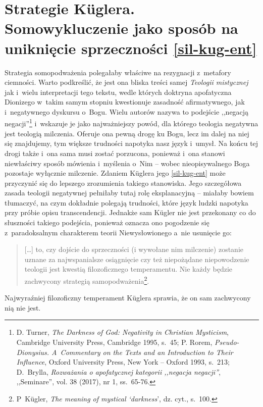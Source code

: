 \section{Strategie Küglera. Somowykluczenie jako sposób na uniknięcie sprzeczności \ref{sil-kug-ent}}

Strategia somopodważenia polegałaby właściwe na rezygnacji z~metafory ciemności. Warto podkreślić, że jest ona bliska treści samej \textit{Teologii mistycznej} jak i~wielu interpretacji tego tekstu, wedle których doktryna apofatyczna Dionizego w~takim samym stopniu kwestionuje zasadność afirmatywnego, jak i~negatywnego dyskursu o~Bogu. Wielu autorów nazywa to podejście ,,negacją negacji''\footnote{D. Turner, \textit{The Darkness of God: Negativity in Christian Mysticism}, Cambridge University Press, Cambridge 1995, s.~45; P. Rorem, \textit{Pseudo-Dionysius. A~Commentary on the Texts and an Introduction to Their Influence}, Oxford University Press, New York -- Oxford 1993, s.~213; D.~Brylla, \textit{Rozważania o apofatycznej kategorii ,,negacja negacji''}, ,,Seminare'', vol. 38 (2017), nr 1, ss.~65-76.} i~wskazuje je jako najważniejszy powód, dla którego teologia negatywna jest teologią milczenia. Oferuje ona pewną drogę ku Bogu, lecz im dalej na niej się znajdujemy, tym większe trudności napotyka nasz język i~umysł. Na końcu tej drogi także i~ona sama musi zostać porzucona, ponieważ i~ona stanowi niewłaściwy sposób mówienia i~myślenia o~Nim -- wobec nieopisywalnego Boga pozostaje wyłącznie milczenie. Zdaniem Küglera jego \ref{sil-kug-ent} może przyczynić się do lepszego zrozumienia takiego stanowiska. Jego szczegółowa zasada teologii negatywnej pełniłaby tutaj rolę eksplanacyjną -- miałaby bowiem tłumaczyć, na czym dokładnie polegają trudności, które język ludzki napotyka przy próbie opisu transcendencji. Jednakże sam Kügler nie jest przekonany co do słuszności takiego podejścia, ponieważ oznacza ono pogodzenie się z~paradoksalnym charakterem teorii Niewysłowionego a~nie usunięcie go:

\begin{quote}
[\ldots] to, czy dojście do sprzeczności (i wywołane nim milczenie) zostanie uznane za najwspanialsze osiągnięcie czy też niepożądane niepowodzenie teologii jest kwestią filozoficznego temperamentu. Nie każdy będzie zachwycony strategią samopodważenia\footnote{P~Kügler, \textit{The meaning of mystical ‘darkness}', dz. cyt., s.~100.}.
\end{quote}
Najwyraźniej filozoficzny temperament Küglera sprawia, że on sam zachwycony nią nie jest.

